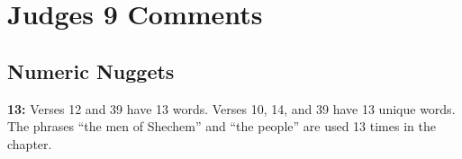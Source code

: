 \section{Judges 9 Comments}

\subsection{Numeric Nuggets}
\textbf{13:} Verses 12 and 39 have 13 words. Verses 10, 14, and 39 have 13 unique words. The phrases ``the men of Shechem'' and ``the people'' are used 13 times in the chapter.

